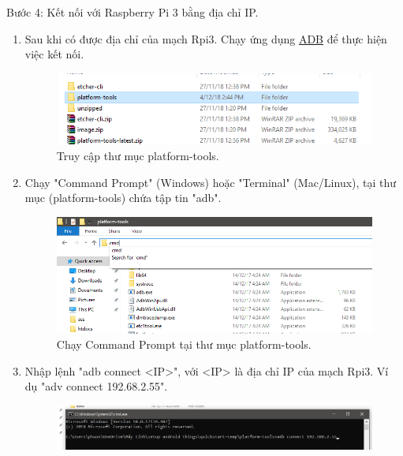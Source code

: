 Bước 4: Kết nối với Raspberry Pi 3 bằng địa chỉ IP.
\begin{enumerate}
\item Sau khi có được địa chỉ của mạch Rpi3. Chạy ứng dụng \hyperref[ADB]{ADB} để thực hiện việc kết nối.
\begin{center}
\begin{figure}[htp]
\begin{center}
\includegraphics[scale=0.62]{image3/buoc3s12.png}
\end{center}
\caption{Truy cập thư mục platform-tools.}
\end{figure}
\end{center}
\item Chạy "Command Prompt" (Windows) hoặc "Terminal" (Mac/Linux), tại thư mục (platform-tools) chứa tập tin "adb".
\begin{center}
\begin{figure}[htp]
\begin{center}
\includegraphics[scale=0.6]{image3/buoc3s13.png}
\end{center}
\caption{Chạy Command Prompt tại thư mục platform-tools.}
\end{figure}
\end{center}
\item Nhập lệnh "adb connect <IP>", với <IP> là địa chỉ IP của mạch Rpi3. Ví dụ "adv connect 192.68.2.55".
\begin{center}
\begin{figure}[htp]
\begin{center}
\includegraphics[scale=0.55]{image3/buoc3s14.png}

\end{center}
\end{figure}
\end{center}
\end{enumerate}
